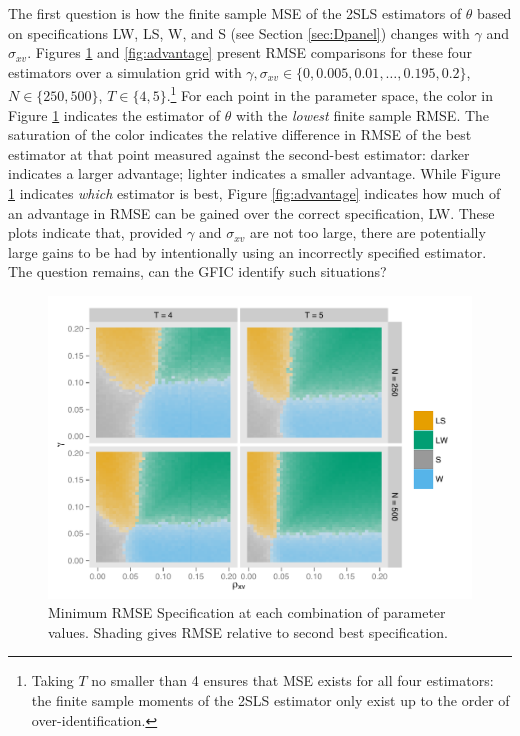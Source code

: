The first question is how the finite sample MSE of the 2SLS estimators of $\theta$ based on specifications LW, LS, W, and S (see Section \ref{sec:Dpanel}) changes with $\gamma$ and $\sigma_{xv}$. 
Figures \ref{fig:best} and \ref{fig:advantage} present RMSE comparisons for these four estimators over a simulation grid with $\gamma, \sigma_{xv} \in \{0, 0.005, 0.01, \hdots, 0.195, 0.2\}$, $N \in \{250,500\}$, $T \in \{4,5\}$.\footnote{Taking $T$ no smaller than 4 ensures that MSE exists for all four estimators: the finite sample moments of the 2SLS estimator only exist up to the order of over-identification.} 
For each point in the parameter space, the color in Figure \ref{fig:best} indicates the estimator of $\theta$ with the \emph{lowest} finite sample RMSE. 
The saturation of the color indicates the relative difference in RMSE of the best estimator at that point measured against the second-best estimator: darker indicates a larger advantage; lighter indicates a smaller advantage. 
While Figure  \ref{fig:best} indicates \emph{which} estimator is best, Figure \ref{fig:advantage} indicates how much of an advantage in RMSE can be gained over the correct specification, LW. 
These plots indicate that, provided $\gamma$ and $\sigma_{xv}$ are not too large, there are potentially large gains to be had by intentionally using an incorrectly specified estimator. 
The question remains, can the GFIC identify such situations?

\begin{figure}
\centering
\includegraphics[scale = 0.8]{best_spec_vs_next_best}
\caption{ Minimum RMSE Specification at each combination of parameter values. Shading gives RMSE relative to second best specification.}
\label{fig:best}
\end{figure}

